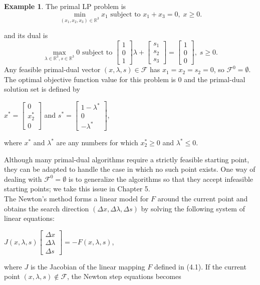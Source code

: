\documentclass[a4paper,10 pt,titlepage,twoside]{book}
\theoremstyle{plain}
\theoremstyle{definition}
\newtheorem{ex}[thm]{Example}
\theoremstyle{remark}
\begin{document}
\begin{ex}
	The primal LP problem is
	\begin{equation*}
	\min\limits_{(x_{1},x_{2},x_{3})\in\mathbb{R}^{3}} x_{1} \text{ subject to }x_{1} + x_{3} = 0, \;x\geq0.
	\end{equation*}

and its dual is 
	\begin{equation*}
\max\limits_{\lambda\in\mathbb{R}^{3}, s\in\mathbb{R}^{3}} 0 \text{ subject to } \begin{bmatrix}1\\0\\1\end{bmatrix}\lambda+\begin{bmatrix}
s_{1}\\s_{2}\\s_{3}
\end{bmatrix}=\begin{bmatrix}1\\0\\0\end{bmatrix},\;s\geq0. 
\end{equation*}
Any feasible primal-dual vector $(x, \lambda, s)\in\mathcal{F}$ has $x_{1}= x_{2}= s_{2}= 0$, so $\mathcal{F}^{0}=\emptyset$. The optimal objective function value for this problem is 0 and the primal-dual solution set is defined by
\begin{center}
$x^{*} = \begin{bmatrix}
0\\x^{*}_{2}\\ 0
\end{bmatrix}$ and $s^{*}=\begin{bmatrix}
1-\lambda^{*}\\0\\-\lambda^{*}
\end{bmatrix}$,  
\end{center}
where $x^{*}$ and $\lambda^{*}$ are any numbers for which $x_{2}^{*}\geq0$ and $\lambda^{*}\leq0$.
\end{ex}
Although many primal-dual algorithms require a strictly feasible starting point, they can be adapted to handle the case in which no such point exists. One way of dealing with $\mathcal{F}^{0}=\emptyset$ is to generalize the algorithms so that
they accept infeasible starting points; we take this issue in Chapter 5. \\
The Newton's method forms a linear model for $\mathit{F}$ around the current point and obtains the search direction $(\Delta x,\Delta \lambda,\Delta s)$ by solving the following system of linear equations:
\begin{center}
	$\mathit{J}(x,\lambda,s)\begin{bmatrix}
	\Delta x\\\Delta\lambda \\\Delta s
	\end{bmatrix}=-\mathit{F}(x,\lambda,s)$,
\end{center}
where $\mathit{J}$ is the Jacobian of the linear mapping $\mathit{F}$ defined in (4.1). If the current point $(x, \lambda, s)\notin\mathcal{F}$, the Newton step equations becomes
\end{document}
